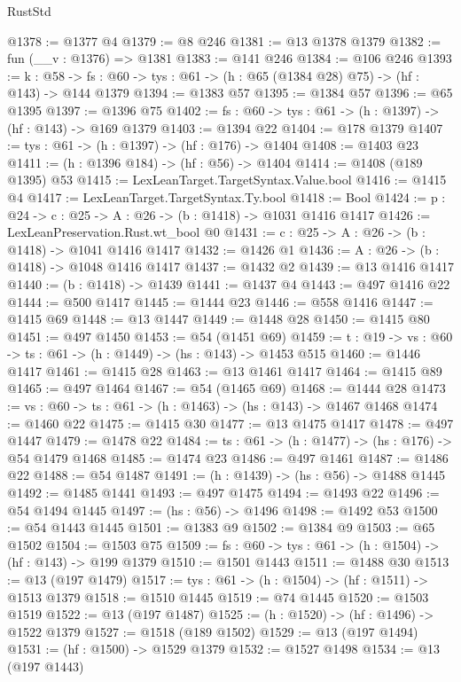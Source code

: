 \begin{lexlean}{RustStd}
\begin{coremodule}
@1378 := @1377 @4
@1379 := @8 @246
@1381 := @13 @1378 @1379
@1382 := fun (__v : @1376) => @1381
@1383 := @141 @246
@1384 := @106 @246
@1393 := {k : @58} ->
  {fs : @60} -> {tys : @61} -> (h : @65 (@1384 @28) @75) -> (hf : @143) -> @144 @1379
@1394 := @1383 @57
@1395 := @1384 @57
@1396 := @65 @1395
@1397 := @1396 @75
@1402 := {fs : @60} -> {tys : @61} -> (h : @1397) -> (hf : @143) -> @169 @1379
@1403 := @1394 @22
@1404 := @178 @1379
@1407 := {tys : @61} -> (h : @1397) -> (hf : @176) -> @1404
@1408 := @1403 @23
@1411 := (h : @1396 @184) -> (hf : @56) -> @1404
@1414 := @1408 (@189 @1395) @53
@1415 := LexLeanTarget.TargetSyntax.Value.bool
@1416 := @1415 @4
@1417 := LexLeanTarget.TargetSyntax.Ty.bool
@1418 := Bool
@1424 := {p : @24} -> {c : @25} -> {A : @26} -> (b : @1418) -> @1031 @1416 @1417
@1426 := LexLeanPreservation.Rust.wt_bool @0
@1431 := {c : @25} -> {A : @26} -> (b : @1418) -> @1041 @1416 @1417
@1432 := @1426 @1
@1436 := {A : @26} -> (b : @1418) -> @1048 @1416 @1417
@1437 := @1432 @2
@1439 := @13 @1416 @1417
@1440 := (b : @1418) -> @1439
@1441 := @1437 @4
@1443 := @497 @1416 @22
@1444 := @500 @1417
@1445 := @1444 @23
@1446 := @558 @1416
@1447 := @1415 @69
@1448 := @13 @1447
@1449 := @1448 @28
@1450 := @1415 @80
@1451 := @497 @1450
@1453 := @54 (@1451 @69)
@1459 := {t : @19} -> {vs : @60} -> {ts : @61} -> (h : @1449) -> (hs : @143) -> @1453 @515
@1460 := @1446 @1417
@1461 := @1415 @28
@1463 := @13 @1461 @1417
@1464 := @1415 @89
@1465 := @497 @1464
@1467 := @54 (@1465 @69)
@1468 := @1444 @28
@1473 := {vs : @60} -> {ts : @61} -> (h : @1463) -> (hs : @143) -> @1467 @1468
@1474 := @1460 @22
@1475 := @1415 @30
@1477 := @13 @1475 @1417
@1478 := @497 @1447
@1479 := @1478 @22
@1484 := {ts : @61} -> (h : @1477) -> (hs : @176) -> @54 @1479 @1468
@1485 := @1474 @23
@1486 := @497 @1461
@1487 := @1486 @22
@1488 := @54 @1487
@1491 := (h : @1439) -> (hs : @56) -> @1488 @1445
@1492 := @1485 @1441
@1493 := @497 @1475
@1494 := @1493 @22
@1496 := @54 @1494 @1445
@1497 := (hs : @56) -> @1496
@1498 := @1492 @53
@1500 := @54 @1443 @1445
@1501 := @1383 @9
@1502 := @1384 @9
@1503 := @65 @1502
@1504 := @1503 @75
@1509 := {fs : @60} -> {tys : @61} -> (h : @1504) -> (hf : @143) -> @199 @1379
@1510 := @1501 @1443
@1511 := @1488 @30
@1513 := @13 (@197 @1479)
@1517 := {tys : @61} -> (h : @1504) -> (hf : @1511) -> @1513 @1379
@1518 := @1510 @1445
@1519 := @74 @1445
@1520 := @1503 @1519
@1522 := @13 (@197 @1487)
@1525 := (h : @1520) -> (hf : @1496) -> @1522 @1379
@1527 := @1518 (@189 @1502)
@1529 := @13 (@197 @1494)
@1531 := (hf : @1500) -> @1529 @1379
@1532 := @1527 @1498
@1534 := @13 (@197 @1443)

\end{coremodule}
\end{lexlean}
